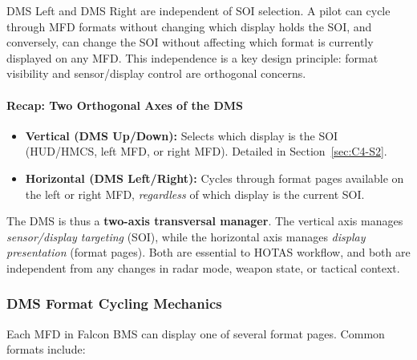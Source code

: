 \documentclass[11pt,a4paper]{article}
\begin{document}
DMS Left and DMS Right are independent of SOI selection. A pilot can cycle through MFD formats without changing which display holds the SOI, and conversely, can change the SOI without affecting which format is currently displayed on any MFD. This independence is a key design principle: format visibility and sensor/display control are orthogonal concerns.

\paragraph*{Recap: Two Orthogonal Axes of the DMS}

\begin{itemize}

\item \textbf{Vertical (DMS Up/Down):} Selects which display is the SOI (HUD/HMCS, left MFD, or right MFD). Detailed in Section~\ref{sec:C4-S2}.

\item \textbf{Horizontal (DMS Left/Right):} Cycles through format pages available on the left or right MFD, \textit{regardless} of which display is the current SOI.

\end{itemize}

The DMS is thus a \textbf{two-axis transversal manager}. The vertical axis manages \textit{sensor/display targeting} (SOI), while the horizontal axis manages \textit{display presentation} (format pages). Both are essential to HOTAS workflow, and both are independent from any changes in radar mode, weapon state, or tactical context.

\subsubsection{DMS Format Cycling Mechanics}
\label{sec:C4-S3-S1}

Each MFD in Falcon BMS can display one of several format pages. Common formats include:
\end{document}
